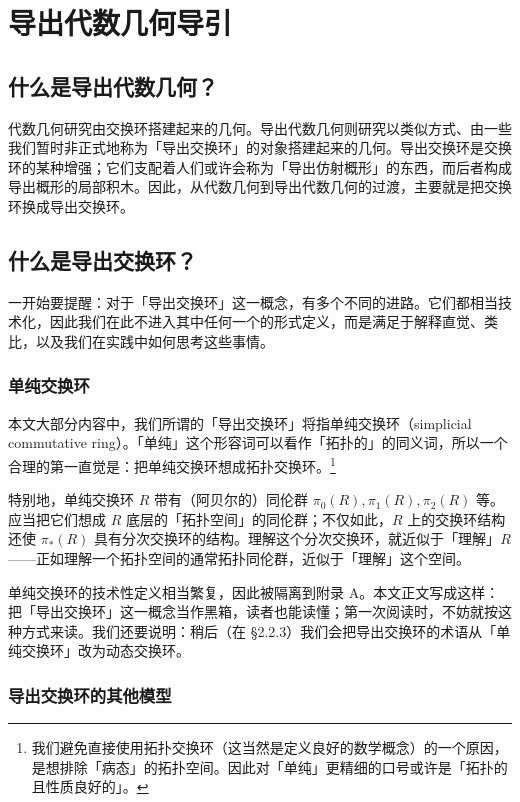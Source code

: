 \section{导出代数几何导引}

\subsection{什么是导出代数几何？}

代数几何研究由交换环搭建起来的几何。导出代数几何则研究以类似方式、由一些我们暂时非正式地称为「导出交换环」的对象搭建起来的几何。导出交换环是交换环的某种增强；它们支配着人们或许会称为「导出仿射概形」的东西，而后者构成导出概形的局部积木。因此，从代数几何到导出代数几何的过渡，主要就是把交换环换成导出交换环。

\subsection{什么是导出交换环？}

一开始要提醒：对于「导出交换环」这一概念，有多个不同的进路。它们都相当技术化，因此我们在此不进入其中任何一个的形式定义，而是满足于解释直觉、类比，以及我们在实践中如何思考这些事情。

\subsubsection{单纯交换环}

本文大部分内容中，我们所谓的「导出交换环」将指单纯交换环（simplicial commutative ring）。「单纯」这个形容词可以看作「拓扑的」的同义词，所以一个合理的第一直觉是：把单纯交换环想成拓扑交换环。\footnote{我们避免直接使用拓扑交换环（这当然是定义良好的数学概念）的一个原因，是想排除「病态」的拓扑空间。因此对「单纯」更精细的口号或许是「拓扑的且性质良好的」。}

特别地，单纯交换环 $R$ 带有（阿贝尔的）同伦群 $\pi_0(R),\pi_1(R),\pi_2(R)$ 等。应当把它们想成 $R$ 底层的「拓扑空间」的同伦群；不仅如此，$R$ 上的交换环结构还使 $\pi_*(R)$ 具有分次交换环的结构。理解这个分次交换环，就近似于「理解」$R$——正如理解一个拓扑空间的通常拓扑同伦群，近似于「理解」这个空间。

单纯交换环的技术性定义相当繁复，因此被隔离到附录 A。本文正文写成这样：把「导出交换环」这一概念当作黑箱，读者也能读懂；第一次阅读时，不妨就按这种方式来读。我们还要说明：稍后（在 §2.2.3）我们会把导出交换环的术语从「单纯交换环」改为动态交换环。

\subsubsection{导出交换环的其他模型}

